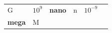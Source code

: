 {\begin{center}
\begin{xtabular*}{\mytablewidth}[t]{|p{10\mystarwidth}|p{10\mystarwidth}|p{10\mystarwidth}|p{10\mystarwidth}|p{10\mystarwidth}|p{10\mystarwidth}|}
        G &
    
    
        
                \begin{math}{10}^{9}\end{math}
               &
    
    
        
                \textbf{nano}
               &
    
    
        n &
    
    
        
                \begin{math}{10}^{-9}\end{math}
     \tabularnewline{}
    
    
        
                \textbf{mega}
               &
    
    
        M &
    
    

\end{xtabular*}
\end{center}}
